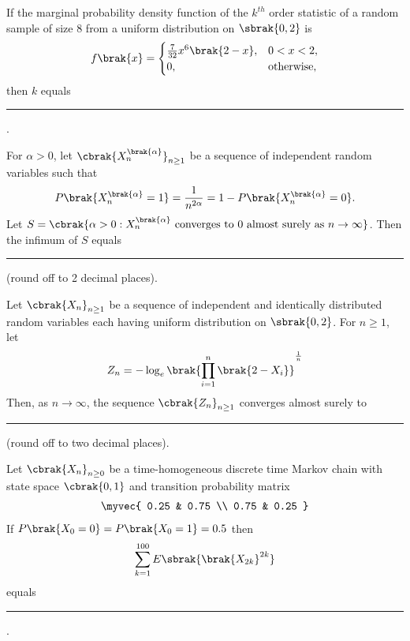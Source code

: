 \iffalse
\chapter{2021}
\author{AI24BTECH11031}
\section{st}
\fi

\item If the marginal probability density function of the $k^{th}$ order statistic of a random sample of size 8 from a
uniform distribution on $\sbrak{0,2}$ is
\begin{align*}    
f\brak{x} = 
\begin{cases} 
\frac{7}{32}x^6\brak{2 - x}, & 0 < x < 2, \\
0, & \text{otherwise}, 
\end{cases}
\end{align*}
then $k$ equals \rule{1.0cm}{0.15mm}.

\item For $\alpha > 0$, let $\cbrak{X_n^{\brak{\alpha}}}_{n\ge1}$ be a sequence of independent random
variables such that 
\begin{align*}
P\brak{X_n^{\brak{\alpha}} = 1} = \frac{1}{n^{2\alpha}} = 1 - P\brak{X_n^{\brak{\alpha}} = 0}.
\end{align*}
Let $S = \cbrak{\alpha > 0 : X_n^{\brak{\alpha}} \text{ converges to } 0 \text{ almost surely as } n \to \infty}$.
Then the infimum of $S$ equals \rule{1.0cm}{0.15mm} (round off to 2 decimal places).

\item Let $\cbrak{X_n}_{n \ge 1}$ be a sequence of independent and identically distributed random variables each
having uniform distribution on $\sbrak{0, 2}$. For $n \ge 1$, let
\begin{align*}
    Z_n = -\log_e \brak{\prod_{i=1}^n \brak{2 - X_i}}^{\frac{1}{n}}
\end{align*}
Then, as $n \to \infty$, the sequence $\cbrak{Z_n}_{n \ge 1}$ converges almost surely to
\rule{1.0cm}{0.15mm} (round off to two decimal places).

\item Let $\cbrak{X_n}_{n \ge 0}$ be a time-homogeneous discrete time Markov chain with state space 
$\cbrak{0, 1}$ and transition probability matrix
\begin{align*}
    \myvec{
        0.25 & 0.75 \\
        0.75 & 0.25
    }
\end{align*}
If $P\brak{X_0 = 0} = P\brak{X_0 = 1} = 0.5$ then
\begin{align*}
    \sum_{k=1}^{100} E\sbrak{\brak{X_{2k}}^{2k}}
\end{align*}
equals \rule{1.0cm}{0.15mm}.

